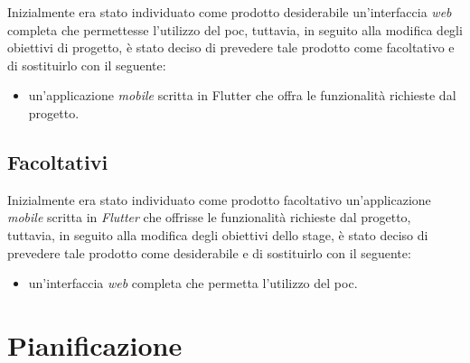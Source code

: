 Inizialmente era stato individuato come prodotto desiderabile un'interfaccia \textit{web} completa che permettesse l'utilizzo del \gls{poc}, tuttavia, in seguito alla modifica degli obiettivi di progetto, è stato deciso di prevedere tale prodotto come facoltativo e di sostituirlo con il seguente:

\begin{itemize}
	\item un'applicazione \textit{mobile} scritta in Flutter che offra le funzionalità richieste dal progetto.
\end{itemize}

\subsection{Facoltativi}

Inizialmente era stato individuato come prodotto facoltativo un'applicazione \textit{mobile} scritta in \textit{Flutter} che offrisse le funzionalità richieste dal progetto, tuttavia, in seguito alla modifica degli obiettivi dello stage, è stato deciso di prevedere tale prodotto come desiderabile e di sostituirlo con il seguente:

\begin{itemize}
	\item un'interfaccia \textit{web} completa che permetta l'utilizzo del \gls{poc}.
\end{itemize} 

\section{Pianificazione}

